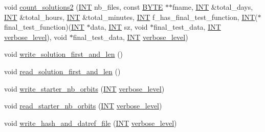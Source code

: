 \begin{DoxyCompactItemize}
void \mbox{\hyperlink{classisomorph_af4188dae2ed875b1e5ba95ee8b3624aa}{count\+\_\+solutions2}} (\mbox{\hyperlink{galois_8h_a09fddde158a3a20bd2dcadb609de11dc}{I\+NT}} nb\+\_\+files, const \mbox{\hyperlink{galois_8h_ab6cc7b4aeb6ea31aba2b3fbfc83ff5e6}{B\+Y\+TE}} $\ast$$\ast$fname, \mbox{\hyperlink{galois_8h_a09fddde158a3a20bd2dcadb609de11dc}{I\+NT}} \&total\+\_\+days, \mbox{\hyperlink{galois_8h_a09fddde158a3a20bd2dcadb609de11dc}{I\+NT}} \&total\+\_\+hours, \mbox{\hyperlink{galois_8h_a09fddde158a3a20bd2dcadb609de11dc}{I\+NT}} \&total\+\_\+minutes, \mbox{\hyperlink{galois_8h_a09fddde158a3a20bd2dcadb609de11dc}{I\+NT}} f\+\_\+has\+\_\+final\+\_\+test\+\_\+function, \mbox{\hyperlink{galois_8h_a09fddde158a3a20bd2dcadb609de11dc}{I\+NT}}($\ast$final\+\_\+test\+\_\+function)(\mbox{\hyperlink{galois_8h_a09fddde158a3a20bd2dcadb609de11dc}{I\+NT}} $\ast$data, \mbox{\hyperlink{galois_8h_a09fddde158a3a20bd2dcadb609de11dc}{I\+NT}} sz, void $\ast$final\+\_\+test\+\_\+data, \mbox{\hyperlink{galois_8h_a09fddde158a3a20bd2dcadb609de11dc}{I\+NT}} \mbox{\hyperlink{simeon_8_c_a818073fbcc2f439e7c56952f67386122}{verbose\+\_\+level}}), void $\ast$final\+\_\+test\+\_\+data, \mbox{\hyperlink{galois_8h_a09fddde158a3a20bd2dcadb609de11dc}{I\+NT}} \mbox{\hyperlink{simeon_8_c_a818073fbcc2f439e7c56952f67386122}{verbose\+\_\+level}})
\item 
void \mbox{\hyperlink{classisomorph_acb8172820825e122c6e785582be1440e}{write\+\_\+solution\+\_\+first\+\_\+and\+\_\+len}} ()
\item 
void \mbox{\hyperlink{classisomorph_affd1e7546f0caf49aac43df1cff96485}{read\+\_\+solution\+\_\+first\+\_\+and\+\_\+len}} ()
\item 
void \mbox{\hyperlink{classisomorph_a31d78d84bbf946c4f4aef923e2b248cf}{write\+\_\+starter\+\_\+nb\+\_\+orbits}} (\mbox{\hyperlink{galois_8h_a09fddde158a3a20bd2dcadb609de11dc}{I\+NT}} \mbox{\hyperlink{simeon_8_c_a818073fbcc2f439e7c56952f67386122}{verbose\+\_\+level}})
\item 
void \mbox{\hyperlink{classisomorph_a1102e2f058d18399ce5155ae33b2f00a}{read\+\_\+starter\+\_\+nb\+\_\+orbits}} (\mbox{\hyperlink{galois_8h_a09fddde158a3a20bd2dcadb609de11dc}{I\+NT}} \mbox{\hyperlink{simeon_8_c_a818073fbcc2f439e7c56952f67386122}{verbose\+\_\+level}})
\item 
void \mbox{\hyperlink{classisomorph_ad4807ab9c5da6368407eb33e1767c6dd}{write\+\_\+hash\+\_\+and\+\_\+datref\+\_\+file}} (\mbox{\hyperlink{galois_8h_a09fddde158a3a20bd2dcadb609de11dc}{I\+NT}} \mbox{\hyperlink{simeon_8_c_a818073fbcc2f439e7c56952f67386122}{verbose\+\_\+level}})
$$
\end{DoxyCompactItemize}
